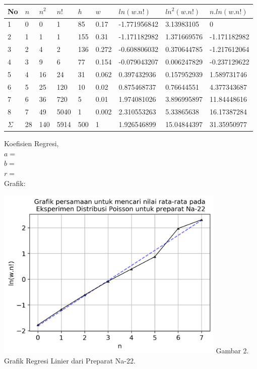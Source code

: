 \documentclass{article}
\begin{document}
				\begin{longtable}{@{}lllllllll@{}}
					\toprule
					No  & $n$  & $n^{2}$ & $n!$   & $h$   & $w$     & $ln(w.n!)$     & $ln^{2}(w.n!)$ & $n.ln(w.n!)$   \\ \midrule
				\endfirsthead
				\endhead
				\bottomrule
				\endfoot
				\endlastfoot
				1   & 0  & 0                    & 1    & 85  & 0.17  & -1.771956842 & 3.13983105                  & 0            \\
				2   & 1  & 1                    & 1    & 155 & 0.31  & -1.171182982 & 1.371669576                 & -1.171182982 \\
				3   & 2  & 4                    & 2    & 136 & 0.272 & -0.608806032 & 0.370644785                 & -1.217612064 \\
				4   & 3  & 9                    & 6    & 77  & 0.154 & -0.079043207 & 0.006247829                 & -0.237129622 \\
				5   & 4  & 16                   & 24   & 31  & 0.062 & 0.397432936  & 0.157952939                 & 1.589731746  \\
				6   & 5  & 25                   & 120  & 10  & 0.02  & 0.875468737  & 0.76644551                  & 4.377343687  \\
				7   & 6  & 36                   & 720  & 5   & 0.01  & 1.974081026  & 3.896995897                 & 11.84448616  \\
				8   & 7  & 49                   & 5040 & 1   & 0.002 & 2.310553263  & 5.33865638                  & 16.17387284  \\* \midrule
				$\Sigma$ & 28 & 140                  & 5914 & 500 & 1     & 1.926546899  & 15.04844397                 & 31.35950977  \\* \bottomrule
				\end{longtable}
			\hspace{-0.6cm}Koefisien Regresi, \\
			$a = $ \\
			$b = $ \\
			$r = $ \\
			Grafik: 
			\begin{center}
				\includegraphics[width=110mm]{Data/Na-22-Graph.png}
				Gambar 2. Grafik Regresi Linier dari Preparat Na-22.
			\end{center}
\end{document}

